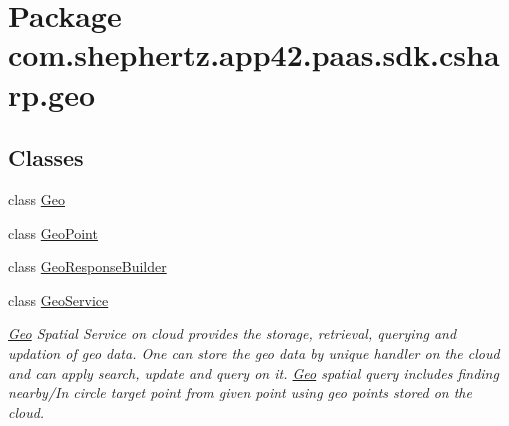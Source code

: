 \hypertarget{namespacecom_1_1shephertz_1_1app42_1_1paas_1_1sdk_1_1csharp_1_1geo}{\section{Package com.\+shephertz.\+app42.\+paas.\+sdk.\+csharp.\+geo}
\label{namespacecom_1_1shephertz_1_1app42_1_1paas_1_1sdk_1_1csharp_1_1geo}
}
\subsection*{Classes}
\begin{DoxyCompactItemize}
\item 
class \hyperlink{classcom_1_1shephertz_1_1app42_1_1paas_1_1sdk_1_1csharp_1_1geo_1_1_geo}{Geo}
\item 
class \hyperlink{classcom_1_1shephertz_1_1app42_1_1paas_1_1sdk_1_1csharp_1_1geo_1_1_geo_point}{Geo\+Point}
\item 
class \hyperlink{classcom_1_1shephertz_1_1app42_1_1paas_1_1sdk_1_1csharp_1_1geo_1_1_geo_response_builder}{Geo\+Response\+Builder}
\item 
class \hyperlink{classcom_1_1shephertz_1_1app42_1_1paas_1_1sdk_1_1csharp_1_1geo_1_1_geo_service}{Geo\+Service}
\begin{DoxyCompactList}\small\item\em \hyperlink{classcom_1_1shephertz_1_1app42_1_1paas_1_1sdk_1_1csharp_1_1geo_1_1_geo}{Geo} Spatial Service on cloud provides the storage, retrieval, querying and updation of geo data. One can store the geo data by unique handler on the cloud and can apply search, update and query on it. \hyperlink{classcom_1_1shephertz_1_1app42_1_1paas_1_1sdk_1_1csharp_1_1geo_1_1_geo}{Geo} spatial query includes finding nearby/\+In circle target point from given point using geo points stored on the cloud. \end{DoxyCompactList}\end{DoxyCompactItemize}

